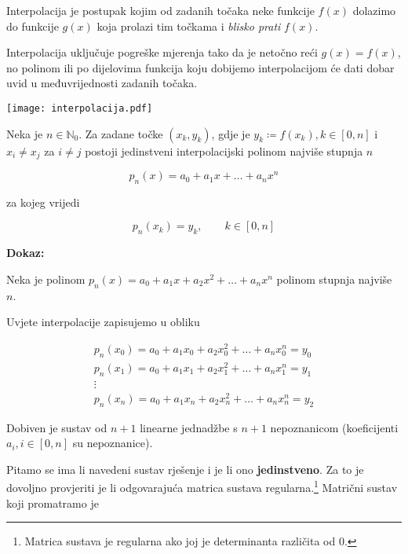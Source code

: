 Interpolacija je postupak kojim od zadanih točaka neke funkcije $f(x)$ dolazimo
do funkcije $g(x)$ koja prolazi tim točkama i \textit{blisko prati} $f(x)$.

Interpolacija uključuje pogreške mjerenja tako da je netočno reći $g(x) = f(x)$,
no polinom ili po dijelovima funkcija koju dobijemo interpolacijom će dati
dobar uvid u međuvrijednosti zadanih točaka.

\begin{center}
    \texttt{[image: interpolacija.pdf]}
\end{center}

\begin{theorem}
    Neka je $n\in\mathbb{N}_0$. Za zadane točke $(x_k,y_k)$, gdje je $y_k\coloneq f(x_k), k\in[0,n]$ i $x_i\neq x_j$ za $i\neq j$ postoji jedinstveni interpolacijski polinom najviše stupnja $n$

    $$
        p_n(x)=a_0+a_1x+\dots+a_nx^n
    $$

    za kojeg vrijedi

    $$
        p_n(x_k) = y_k,\qquad k\in[0,n]
    $$
\end{theorem}

\textbf{Dokaz:}

\bigskip

Neka je polinom $p_n(x)=a_0+a_1x+a_2x^2+\dots+a_nx^n$ polinom stupnja najviše $n$.

Uvjete interpolacije zapisujemo u obliku

\begin{gather*}
    p_n(x_0)=a_0+a_1x_0+a_2x_0^2+\dots+a_nx_0^n=y_0\\
    p_n(x_1)=a_0+a_1x_1+a_2x_1^2+\dots+a_nx_1^n=y_1\\
    \vdots\\
    p_n(x_n)=a_0+a_1x_n+a_2x_n^2+\dots+a_nx_n^n=y_2
\end{gather*}

Dobiven je sustav od $n+1$ linearne jednadžbe s $n+1$ nepoznanicom (koeficijenti $a_i, i\in[0,n]$ su nepoznanice).

Pitamo se ima li navedeni sustav rješenje i je li ono \textbf{jedinstveno}.
Za to je dovoljno provjeriti je li odgovarajuća matrica sustava regularna.\footnote{Matrica sustava je regularna ako joj je determinanta različita od 0.}
Matrični sustav koji promatramo je

